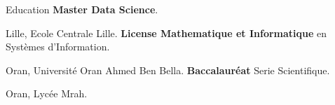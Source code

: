 \begin{rubric}{Education}
    \entry*[2024 -- 2026]%
    \textbf{Master Data Science}.
    \par Lille, Ecole Centrale Lille.
    \entry*[2021 -- 2024]%
    \textbf{License Mathematique et Informatique} en Systèmes d'Information.\par
    Oran, Université Oran Ahmed Ben Bella.
    \entry*[2020 -- 2021]%
    \textbf{Baccalauréat} Serie Scientifique.\par
    Oran, Lycée Mrah.
\end{rubric}